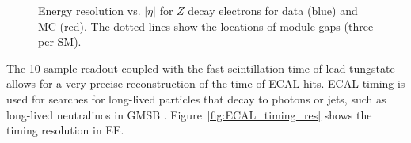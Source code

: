 \documentclass[dissertation.tex]{subfiles}
\begin{document}
\begin{figure}
	\centering
	\hspace{1cm}
	\caption{Energy resolution vs. $|\eta|$ for $Z$ decay electrons for data (blue) and MC (red).  The dotted lines show the locations of module gaps (three per SM).}
	\label{fig:ECAL_res_vs_eta}
\end{figure}

The 10-sample readout coupled with the fast scintillation time of lead tungstate allows for a very precise reconstruction of the time of ECAL hits.  ECAL timing is used for searches for long-lived particles that decay to photons or jets, such as long-lived neutralinos in GMSB \cite{long-lived_GMSB_paper}.  Figure~\ref{fig:ECAL_timing_res} shows the timing resolution in EE.
\end{document}
